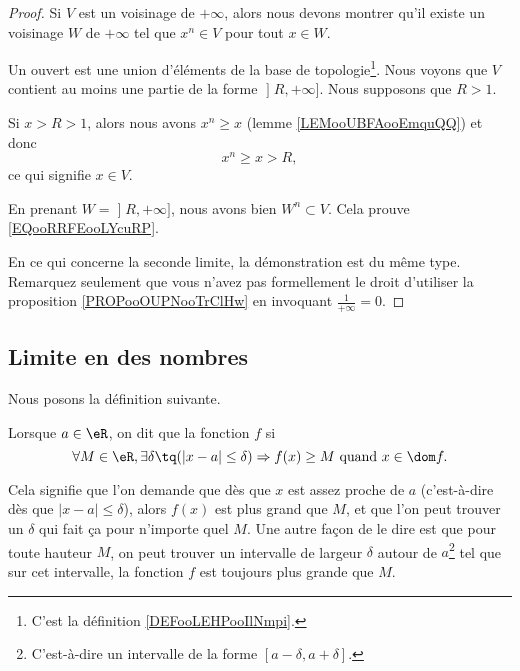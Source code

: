\begin{proof}
	Si \( V\) est un voisinage de \( +\infty\), alors nous devons montrer qu'il existe un voisinage \( W\) de \( +\infty\) tel que \( x^n\in V\) pour tout \( x\in W\).

	Un ouvert est une union d'éléments de la base de topologie\footnote{C'est la définition \ref{DEFooLEHPooIlNmpi}.}. Nous voyons que \( V\) contient au moins une partie de la forme \( \mathopen] R , +\infty \mathclose]\). Nous supposons que \( R>1\).

	Si \( x>R>1\), alors nous avons \( x^n\geq x\) (lemme \ref{LEMooUBFAooEmquQQ}) et donc
	\begin{equation}
		x^n\geq x>R,
	\end{equation}
	ce qui signifie \( x\in V\).

	En prenant \( W=\mathopen] R , +\infty \mathclose]\), nous avons bien \( W^n\subset V\). Cela prouve \eqref{EQooRRFEooLYcuRP}.

	En ce qui concerne la seconde limite, la démonstration est du même type. Remarquez seulement que vous n'avez pas formellement le droit d'utiliser la proposition \ref{PROPooOUPNooTrClHw} en invoquant \( \frac{1}{ +\infty }=0\).
\end{proof}

\subsection{Limite en des nombres}

Nous posons la définition suivante.
\begin{definition}      \label{DefInfNombre}
	Lorsque \( a\in\eR\), on dit que la fonction \( f\)  si
	\[
		\forall M\in\eR,\exists \delta\tq (| x-a |\leq \delta )\Rightarrow f(x)\geq M\text{ quand }x\in\dom f.
	\]
\end{definition}
Cela signifie que l'on demande que dès que \( x\) est assez proche de \( a\) (c'est-à-dire dès que \( | x-a |\leq\delta\)), alors \( f(x)\) est plus grand que \( M\), et que l'on peut trouver un \( \delta\) qui fait ça pour n'importe quel \( M\). Une autre façon de le dire est que pour toute hauteur \( M\), on peut trouver un intervalle de largeur \( \delta\) autour de \( a\)\footnote{C'est-à-dire un intervalle de la forme \( [a-\delta,a+\delta]\).} tel que sur cet intervalle, la fonction \( f\) est toujours plus grande que \( M\).

